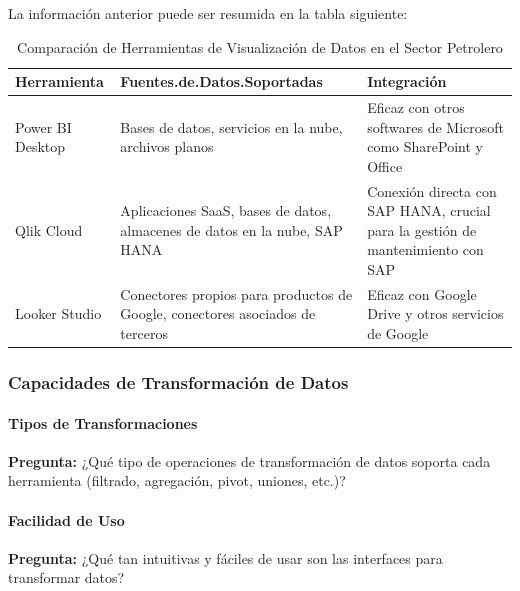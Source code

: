 \documentclass[
  11pt,
  bookmarksnumbered]{article}
\begin{document}
La información anterior puede ser resumida en la tabla siguiente:

\begin{table}[H]

\caption{\label{tab:unnamed-chunk-13}Comparación de Herramientas de Visualización de Datos en el Sector Petrolero}
\centering
\fontsize{9}{11}\selectfont
\begin{tabular}[t]{>{\raggedright\arraybackslash}p{10em}|>{\raggedright\arraybackslash}p{15em}|>{\raggedright\arraybackslash}p{10em}}
\hline
Herramienta & Fuentes.de.Datos.Soportadas & Integración\\
\hline
Power BI Desktop & Bases de datos, servicios en la nube, archivos planos & Eficaz con otros softwares de Microsoft como SharePoint y Office\\
\hline
Qlik Cloud & Aplicaciones SaaS, bases de datos, almacenes de datos en la nube, SAP HANA & Conexión directa con SAP HANA, crucial para la gestión de mantenimiento con SAP\\
\hline
Looker Studio & Conectores propios para productos de Google, conectores asociados de terceros & Eficaz con Google Drive y otros servicios de Google\\
\hline
\end{tabular}
\end{table}

\hypertarget{capacidades-de-transformaciuxf3n-de-datos}{%
\subsubsection{Capacidades de Transformación de Datos}\label{capacidades-de-transformaciuxf3n-de-datos}}

\hypertarget{tipos-de-transformaciones}{%
\paragraph{Tipos de Transformaciones}\label{tipos-de-transformaciones}}

\textbf{Pregunta:} ¿Qué tipo de operaciones de transformación de datos soporta cada herramienta (filtrado, agregación, pivot, uniones, etc.)?

\hypertarget{facilidad-de-uso}{%
\paragraph{Facilidad de Uso}\label{facilidad-de-uso}}

\textbf{Pregunta:} ¿Qué tan intuitivas y fáciles de usar son las interfaces para transformar datos?
\end{document}
